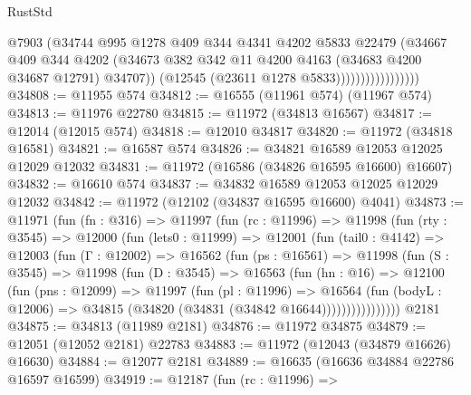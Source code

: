 \begin{lexlean}{RustStd}
\begin{coremodule}
                                @7903
                                (@34744
                                  @995
                                  @1278
                                  @409
                                  @344
                                  @4341
                                  @4202
                                  @5833
                                  @22479
                                  (@34667
                                    @409
                                    @344
                                    @4202
                                    (@34673
                                      @382
                                      @342
                                      @11
                                      @4200
                                      @4163
                                      (@34683 @4200 @34687 @12791)
                                      @34707))
                                  (@12545 (@23611 @1278 @5833)))))))))))))))))
@34808 := @11955 @574
@34812 := @16555 (@11961 @574) (@11967 @574)
@34813 := @11976 @22780
@34815 := @11972 (@34813 @16567)
@34817 := @12014 (@12015 @574)
@34818 := @12010 @34817
@34820 := @11972 (@34818 @16581)
@34821 := @16587 @574
@34826 := @34821 @16589 @12053 @12025 @12029 @12032
@34831 := @11972 (@16586 (@34826 @16595 @16600) @16607)
@34832 := @16610 @574
@34837 := @34832 @16589 @12053 @12025 @12029 @12032
@34842 := @11972 (@12102 (@34837 @16595 @16600) @4041)
@34873 := @11971
    (fun (fn : @316) =>
    @11997
      (fun (rc : @11996) =>
      @11998
        (fun (rty : @3545) =>
        @12000
          (fun (lets0 : @11999) =>
          @12001
            (fun (tail0 : @4142) =>
            @12003
              (fun (Γ : @12002) =>
              @16562
                (fun (ps : @16561) =>
                @11998
                  (fun (S : @3545) =>
                  @11998
                    (fun (D : @3545) =>
                    @16563
                      (fun (hn : @16) =>
                      @12100
                        (fun (pns : @12099) =>
                        @11997
                          (fun (pl : @11996) =>
                          @16564
                            (fun (bodyL : @12006) =>
                            @34815 (@34820 (@34831 (@34842 @16644))))))))))))))))
    @2181
@34875 := @34813 (@11989 @2181)
@34876 := @11972 @34875
@34879 := @12051 (@12052 @2181) @22783
@34883 := @11972 (@12043 (@34879 @16626) @16630)
@34884 := @12077 @2181
@34889 := @16635 (@16636 @34884 @22786 @16597 @16599)
@34919 := @12187
    (fun (rc : @11996) =>

\end{coremodule}
\end{lexlean}
